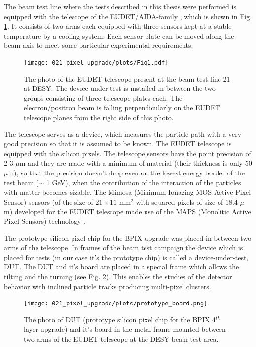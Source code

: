 The beam test line where the tests described in this thesis were performed is equipped with the telescope of the EUDET/AIDA-family \cite{EUDET},
which is shown in Fig. \ref{fig:EUDET_tel}. It consists of two arms each equipped with three sensors kept at a stable temperature by a cooling
system. Each sensor plate can be moved along the beam axis to meet some particular experimental requirements.

\begin{figure}[t]
 \centering
 \texttt{[image: 021\_pixel\_upgrade/plots/Fig1.pdf]}
 \caption{The photo of the EUDET telescope present at the beam test line 21 at DESY. The device under test is installed in between the two
 groups consisting of three telescope plates each. The electron/positron beam is falling perpendicularly on the EUDET telescope planes 
 from the right side of this photo.}
 \label{fig:EUDET_tel}
\end{figure}

The telescope serves as a device, which measures the particle path with a very good precision so that it is assumed to be known.
The EUDET telescope is equipped with the silicon pixels. The telescope sensors have the point precision of 2-3 $\mu$m and they
are made with a minimum of material (their thickness is only 50 $\mu$m), so that the precision doesn't drop even on the lowest 
energy border of the test beam ($\sim$ 1 GeV), when the contribution of the interaction of the particles with matter becomes 
sizable. The Mimosa (Minimum Ionazing MOS Active Pixel Sensor) sensors (of the size of $21 \times 11$ mm$^{2}$ with squared 
pixels of size of 18.4 $\mu$m) developed for the EUDET telescope made use of the MAPS (Monolitic Active Pixel Sensors) 
technology \cite{2001NIMPA.458..677T, Fischer:2002bv}.

The prototype silicon pixel chip for the BPIX upgrade was placed in between two arms of the telescope. In frames of the beam test 
campaign the device which is placed for tests (in our case it's the prototype chip) is called a device-under-test, DUT. The DUT
and it's board are placed in a special frame which allows the tilting and the turning (see Fig. \ref{fig:prototype_board}). 
This enables the studies of the detector behavior with inclined particle tracks producing multi-pixel clusters. 

\begin{figure}[t]
 \centering
 \texttt{[image: 021\_pixel\_upgrade/plots/prototype\_board.png]}
 \caption{The photo of DUT (prototype silicon pixel chip for the BPIX 4$^{th}$ layer upgrade) and it's board in the metal frame
 mounted between two arms of the EUDET telescope at the DESY beam test area.}
 \label{fig:prototype_board}
\end{figure}

